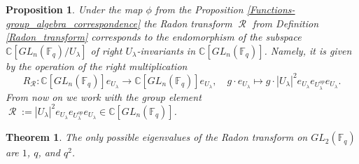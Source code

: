\documentclass[10pt,a4paper]{amsart}
\newtheorem{prop}{Proposition}
\newtheorem{thm}{Theorem}
\newcommand{\CC}{\mathbb{C}}
\newcommand{\GL}[1]{GL_{#1}(\mathbb{F}_q)}
\def\IM#1{\textcolor[rgb]{0.00,0.00,0.75}{[I: #1]}}
\DeclareMathOperator{\R}{\mathcal{R}}
\begin{document}
\begin{prop}\label{Radon Expansion}
    Under the map $\phi$ from the Proposition \ref{Functions-group_algebra_correspondence} the Radon transform $\R$ from Definition \ref{Radon_transform} corresponds to the endomorphism of the subspace $\CC[\GL{n}/U_{\lambda}]$ of right $U_{\lambda}$-invariants in $\CC[\GL{n}]$. Namely, it is given by the operation of the right multiplication
    \begin{equation}
        R_{\R}: \CC[\GL{n}]e_{U_{\lambda}} \rightarrow \CC[\GL{n}]e_{U_{\lambda}}, \quad g\cdot e_{U_{\lambda}} \mapsto g\cdot |U_{\lambda}|^2e_{U_{\lambda}}e_{U_{\lambda}^{op}}e_{U_{\lambda}}.
    \end{equation}
    From now on we work with the group element $\R:=|U_{\lambda}|^2e_{U_{\lambda}}e_{U_{\lambda}^{op}}e_{U_{\lambda}} \in \CC[\GL{n}]$.
    

\end{prop}

\begin{thm}\label{eigenvalues_gl2}
    The only possible eigenvalues of the Radon transform on $\GL{2}$ are $1$, $q$, and $q^2$.
\end{thm}
\end{document}
